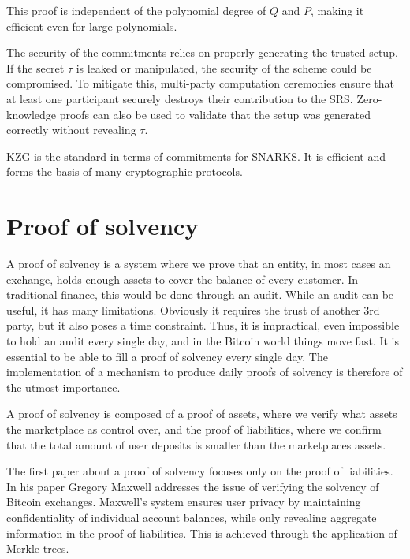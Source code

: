 This proof is independent of the polynomial degree of $Q$ and $P$, making it efficient even for large polynomials.


The security of the commitments relies on properly generating the trusted setup. 
If the secret $\tau$ is leaked or manipulated, the security of the scheme could be compromised. 
To mitigate this, multi-party computation ceremonies ensure that at least one participant securely destroys their contribution to the SRS. 
Zero-knowledge proofs can also be used to validate that the setup was generated correctly without revealing $\tau$.

KZG is the standard in terms of commitments for SNARKS. It is efficient and forms the basis of many cryptographic protocols. \cite{vODC24}


\section{Proof of solvency}

A proof of solvency is a system where we prove that an entity, in most cases an exchange, holds enough assets to cover
the balance of every customer. In traditional finance, this would be done through an audit. While an audit can be useful,
it has many limitations. Obviously it requires the trust of another 3rd party, but it also poses a time constraint. Thus, it is impractical, even impossible
to hold an audit every single day, and in the Bitcoin world things move fast. It is essential to be able to fill a proof of solvency every single day.
The implementation of a mechanism to produce daily proofs of solvency is therefore of the utmost importance.

A proof of solvency is composed of a proof of assets, where we verify what assets the marketplace as control over, and the proof of liabilities,
where we confirm that the total amount of user deposits is smaller than the marketplaces assets.

The first paper about a proof of solvency focuses only on the proof of liabilities. In his paper Gregory Maxwell addresses the issue of verifying
the solvency of Bitcoin exchanges. \cite{chainlink_blog}
Maxwell's system ensures user privacy by maintaining confidentiality of individual account balances, while only revealing aggregate information in the proof of liabilities.
This is achieved through the application of Merkle trees.


